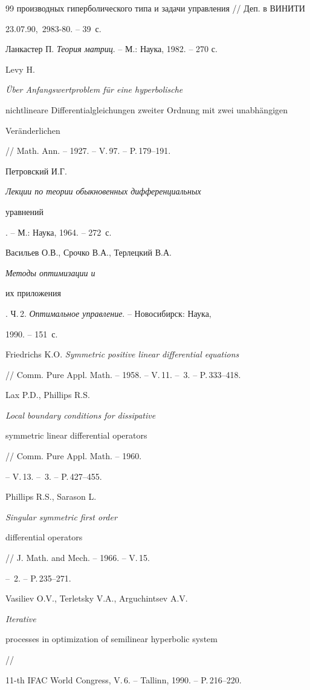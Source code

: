\begin{thebibliography}{99}
{производных гиперболического типа и задачи управления} // Деп. в ВИНИТИ 


23.07.90, \No\,2983-80. -- 39~с.




Ланкастер П. {\em Теория матриц}. -- М.: Наука, 1982. -- 270 с.




Levy H. {\em \"Uber Anfangswertproblem f\"ur eine hyperbolische 


nichtlineare Differentialgleichungen zweiter Ordnung mit zwei unabh\"angigen


Ver\"anderlichen} // Math. Ann. -- 1927. -- V.\,97. -- P.\,179--191.




Петровский И.Г. {\em Лекции по теории обыкновенных дифференциальных 


уравнений}. -- М.: Наука, 1964. -- 272~с.




Васильев О.В., Срочко В.А., Терлецкий В.А. {\em Методы оптимизации и


их приложения}. Ч.\,2. {\em Оптимальное управление}. -- Новосибирск: Наука,


1990. -- 151~с.




Friedrichs K.O. {\em Symmetric positive linear differential equations}


// Comm. Pure Appl. Math. -- 1958. -- V.\,11. -- \No\,3. -- P.\,333--418.




Lax P.D., Phillips R.S. {\em Local boundary conditions for dissipative 


symmetric linear differential operators} // Comm. Pure Appl. Math. -- 1960.


-- V.\,13. -- \No\,3. -- P.\,427--455.




Phillips R.S., Sarason L. {\em Singular symmetric first order


differential operators} // J. Math. and Mech. -- 1966. -- V.\,15.


-- \No\,2. -- P.\,235--271.




Vasiliev O.V., Terletsky V.A., Arguchintsev A.V. {\em Iterative


processes in optimization of semilinear hyperbolic system} //


11-th IFAC World Congress, V.\,6. -- Tallinn, 1990. -- P.\,216--220.



\end{thebibliography}
